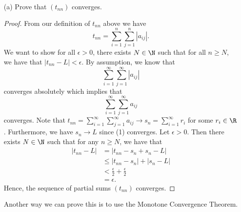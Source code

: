 \begin{enumerate}
    \item[(a)] Prove that \( (t_{nn})\) converges. 
        \begin{proof}
            From our definition of \( t_{nn}\) above we have 
            \[ t_{nn} = \sum_{ i=1 }^{ n } \sum_{ j=1 }^{ n } | a_{ij} |.\] 
            We want to show for all \(\epsilon > 0 \), there exists \( N \in \N \) such that for all \( n \geq  N \), we have that  \( |t_{nn} - L  | < \epsilon \). By assumption, we know that 
            \[  \sum_{ i=1 }^{ \infty  } \sum_{ j=1 }^{ \infty  } | a_{ij} |  \tag{1}\] 
            converges absolutely which implies that 
            \[  \sum_{ i=1 }^{ \infty  } \sum_{ j=1 }^{ \infty   } a_{ij} \] 
            converges. Note that \( t_{nn} = \sum_{ i=1 }^{ \infty   } \sum_{ j=1 }^{ \infty  } a_{ij}  \to s_n = \sum_{ i=1 }^{ \infty  } r_i \) for some \( r_i \in \R  \). Furthermore, we have \( s_n \to L  \) since (1) converges. Let \( \epsilon  > 0  \). Then there exists \(  N \in \N  \) such that for any \(  n \geq N  \), we have that 
            \begin{align*}
                | t_{nn} - L  | &= | t_{nn} -s_n + s_n - L |  \\
                                &\leq  | t_{nn} - s_n  | + | s_n - L  | \\
                                &< \frac{ \epsilon  }{ 2 } + \frac{ \epsilon  }{ 2 } \\
                                &= \epsilon.
            \end{align*}
            Hence, the sequence of partial sums \(  (t_{nn}) \) converges. 
        \end{proof}

        Another way we can prove this is to use the Monotone Convergence Theorem. 


\end{enumerate}
